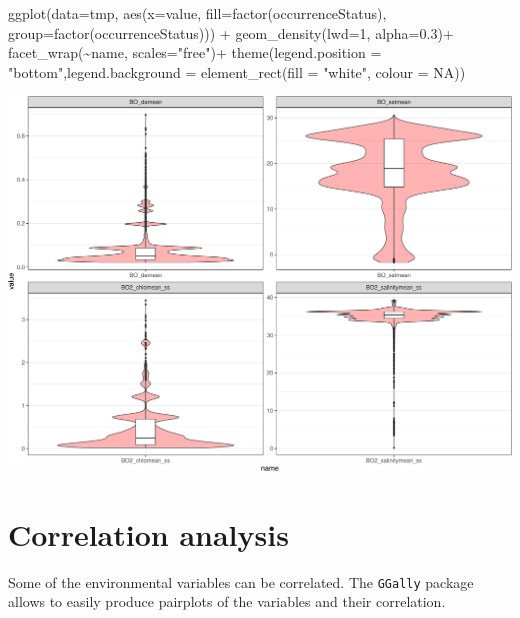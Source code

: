 \documentclass[
]{book}
\newenvironment{Shaded}{\begin{snugshade}}{\end{snugshade}}
\newcommand{\AttributeTok}[1]{\textcolor[rgb]{0.77,0.63,0.00}{#1}}
\newcommand{\ConstantTok}[1]{\textcolor[rgb]{0.00,0.00,0.00}{#1}}
\newcommand{\DecValTok}[1]{\textcolor[rgb]{0.00,0.00,0.81}{#1}}
\newcommand{\FloatTok}[1]{\textcolor[rgb]{0.00,0.00,0.81}{#1}}
\newcommand{\FunctionTok}[1]{\textcolor[rgb]{0.00,0.00,0.00}{#1}}
\newcommand{\NormalTok}[1]{#1}
\newcommand{\SpecialCharTok}[1]{\textcolor[rgb]{0.00,0.00,0.00}{#1}}
\newcommand{\StringTok}[1]{\textcolor[rgb]{0.31,0.60,0.02}{#1}}
\begin{document}
\begin{Shaded}
\begin{Highlighting}[]
\FunctionTok{ggplot}\NormalTok{(}\AttributeTok{data=}\NormalTok{tmp, }\FunctionTok{aes}\NormalTok{(}\AttributeTok{x=}\NormalTok{value, }\AttributeTok{fill=}\FunctionTok{factor}\NormalTok{(occurrenceStatus), }\AttributeTok{group=}\FunctionTok{factor}\NormalTok{(occurrenceStatus))) }\SpecialCharTok{+} 
  \FunctionTok{geom\_density}\NormalTok{(}\AttributeTok{lwd=}\DecValTok{1}\NormalTok{, }\AttributeTok{alpha=}\FloatTok{0.3}\NormalTok{)}\SpecialCharTok{+}
  \FunctionTok{facet\_wrap}\NormalTok{(}\SpecialCharTok{\textasciitilde{}}\NormalTok{name, }\AttributeTok{scales=}\StringTok{"free"}\NormalTok{)}\SpecialCharTok{+}
  \FunctionTok{theme}\NormalTok{(}\AttributeTok{legend.position =} \StringTok{"bottom"}\NormalTok{,}\AttributeTok{legend.background =} \FunctionTok{element\_rect}\NormalTok{(}\AttributeTok{fill =} \StringTok{"white"}\NormalTok{, }\AttributeTok{colour =} \ConstantTok{NA}\NormalTok{))}
\end{Highlighting}
\end{Shaded}

\includegraphics{_main_files/figure-latex/unnamed-chunk-49-2.pdf}

\hypertarget{correlation-analysis}{%
\section{Correlation analysis}\label{correlation-analysis}}

Some of the environmental variables can be correlated. The \texttt{GGally} package allows to easily produce pairplots of the variables and their correlation.
\end{document}
